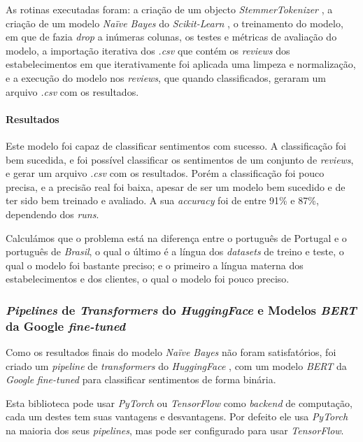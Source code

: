 As rotinas executadas foram: a criação de um objecto \textit{StemmerTokenizer} \cite{skl1}, a criação de um modelo \textit{Naïve Bayes} do \textit{Scikit-Learn} \cite{skl1}, o treinamento do modelo, em que de fazia \textit{drop} a inúmeras colunas, os testes e métricas de avaliação do modelo, a importação iterativa dos \textit{.csv} que contém os \textit{reviews} dos estabelecimentos em que iterativamente foi aplicada uma limpeza e normalização, e a execução do modelo nos \textit{reviews}, que quando classificados, geraram um arquivo \textit{.csv} com os resultados.

\paragraph{Resultados\\}

Este modelo foi capaz de classificar sentimentos com sucesso. A classificação foi bem sucedida, e foi possível classificar os sentimentos de um conjunto de \textit{reviews}, e gerar um arquivo \textit{.csv} com os resultados. Porém a classificação foi pouco precisa, e a precisão real foi baixa, apesar de ser um modelo bem sucedido e de ter sido bem treinado e avaliado. A sua \textit{accuracy} foi de entre 91\% e 87\%, dependendo dos \textit{runs}.

Calculámos que o problema está na diferença entre o português de Portugal e o português de \textit{Brasil}, o qual o último é a língua dos \textit{datasets} de treino e teste, o qual o modelo foi bastante preciso; e o primeiro a língua materna dos estabelecimentos e dos clientes, o qual o modelo foi pouco preciso.

\subsubsection{\textit{Pipelines} de \textit{Transformers} do \textit{HuggingFace} e Modelos \textit{BERT} da Google \textit{fine-tuned}}

Como os resultados finais do modelo \textit{Naïve Bayes} não foram satisfatórios, foi criado um \textit{pipeline} de \textit{transformers} do \textit{HuggingFace} \cite{yt2}, com um modelo \textit{BERT} da \textit{Google} \textit{fine-tuned} para classificar sentimentos de forma binária.

Esta biblioteca pode usar \textit{PyTorch} ou \textit{TensorFlow} como \textit{backend} de computação, cada um destes tem suas vantagens e desvantagens. Por defeito ele usa \textit{PyTorch} na maioria dos seus \textit{pipelines}, mas pode ser configurado para usar \textit{TensorFlow}.

